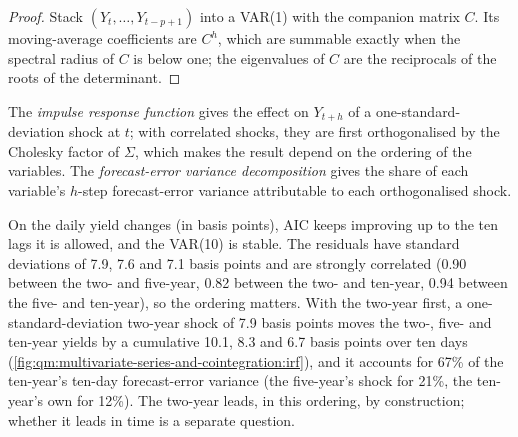 \begin{proof}
Stack $(Y_t, \dots, Y_{t-p+1})$ into a VAR(1) with the companion matrix $C$. Its moving-average coefficients are $C^h$, which are summable exactly when the
spectral radius of $C$ is below one; the eigenvalues of $C$ are the reciprocals of the roots of the determinant.
\end{proof}

\begin{definition}\label{def:qm:multivariate-series-and-cointegration:irf}
The \emph{impulse response function} gives the effect on $Y_{t+h}$ of a one-standard-deviation shock at $t$; with correlated
shocks, they are first orthogonalised by the Cholesky factor of $\Sigma$, which makes the result depend on the ordering of the variables. The
\emph{forecast-error variance decomposition} gives the share of each variable's $h$-step forecast-error variance
attributable to each orthogonalised shock.
\end{definition}

On the daily yield changes (in basis points), AIC keeps improving up to the ten lags it is allowed, and the VAR(10) is stable. The residuals have standard
deviations of 7.9, 7.6 and 7.1 basis points and are strongly correlated (0.90 between the two- and five-year, 0.82 between the two- and ten-year, 0.94 between
the five- and ten-year), so the ordering matters. With the two-year first, a one-standard-deviation two-year shock of 7.9 basis points moves the two-, five-
and ten-year yields by a cumulative 10.1, 8.3 and 6.7 basis points over ten days (\cref{fig:qm:multivariate-series-and-cointegration:irf}), and it accounts
for 67\% of the ten-year's ten-day forecast-error variance (the five-year's shock for 21\%, the ten-year's own for 12\%). The two-year leads, in this ordering,
by construction; whether it leads in time is a separate question.

